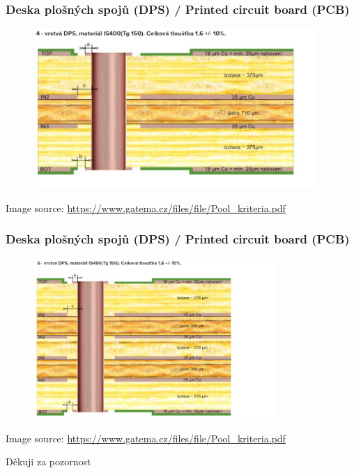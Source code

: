 \documentclass[12;pt,t]{beamer} %
\newcommand{\srctext}[1]{{\fontsize{7}{9}\selectfont\textcolor{sourcesclr}{#1}}}
\begin{document}
\begin{frame}
\frametitle{Deska plošných spojů (DPS) / Printed circuit board (PCB)}    	
\begin{figure}[H]
	\includegraphics[width=0.96\textwidth]{img/Gatema_4-vrstva-DPS.png}
\end{figure}
\srctext{Image source: \url{https://www.gatema.cz/files/file/Pool_kriteria.pdf}}
\end{frame}

\begin{frame}
\frametitle{Deska plošných spojů (DPS) / Printed circuit board (PCB)}    	
\begin{figure}[H]
	\includegraphics[width=0.82\textwidth]{img/Gatema_6-vrstva-DPS.png}
\end{figure}
\srctext{Image source: \url{https://www.gatema.cz/files/file/Pool_kriteria.pdf}}
\end{frame}




\begin{frame}[fragile]
	\vfill
    \begin{center}
        {\huge Děkuji za pozornost}
	\end{center}
	\vfill
\end{frame}
\end{document}
